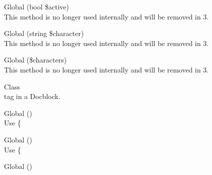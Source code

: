 \begin{DoxyRefList}
\item[Global \doxylink{interface_league_1_1_common_mark_1_1_delimiter_1_1_delimiter_interface_a9dc26df3e3751b78302f0787100c8b99}{Delimiter\+Interface\+::set\+Active} (bool \$active)]\hfill \\
\label{deprecated__deprecated000125}%
%
This method is no longer used internally and will be removed in 3.  
\item[Global \doxylink{class_league_1_1_common_mark_1_1_delimiter_1_1_delimiter_stack_af51491d30cbfc7a90764afe1a6bf84c9}{Delimiter\+Stack\+::remove\+Earlier\+Matches} (string \$character)]\hfill \\
\label{deprecated__deprecated000127}%
%
This method is no longer used internally and will be removed in 3.  
\item[Global \doxylink{class_league_1_1_common_mark_1_1_delimiter_1_1_delimiter_stack_a215d5fd077ff8373e2ca2fa502892eb0}{Delimiter\+Stack\+::search\+By\+Character} (\$characters)]\hfill \\
\label{deprecated__deprecated000128}%
%
This method is no longer used internally and will be removed in 3. 
\item[Class \doxylink{class_barryvdh_1_1_reflection_1_1_doc_block_1_1_tag_1_1_deprecated_tag}{Deprecated\+Tag} ]\hfill \\
\label{deprecated__deprecated000002}%
%
tag in a Docblock. 
\item[Global \doxylink{interface_ramsey_1_1_uuid_1_1_deprecated_uuid_interface_a4064a5c9a6c20cfdc25d6dfc79aa4ea5}{Deprecated\+Uuid\+Interface\+::get\+Clock\+Seq\+Hi\+And\+Reserved\+Hex} ()]\hfill \\
\label{deprecated__deprecated000350}%
%
Use \{ 
\item[Global \doxylink{interface_ramsey_1_1_uuid_1_1_deprecated_uuid_interface_a8bbc61bf61b26dc4cb1c44deb306a95a}{Deprecated\+Uuid\+Interface\+::get\+Clock\+Seq\+Low\+Hex} ()]\hfill \\
\label{deprecated__deprecated000351}%
%
Use \{ 
\item[Global \doxylink{interface_ramsey_1_1_uuid_1_1_deprecated_uuid_interface_a1a7e4340050f5494cbbc3366977e3cf2}{Deprecated\+Uuid\+Interface\+::get\+Clock\+Sequence\+Hex} ()]\hfill \\
\label{deprecated__deprecated000352}%

\end{DoxyRefList}
